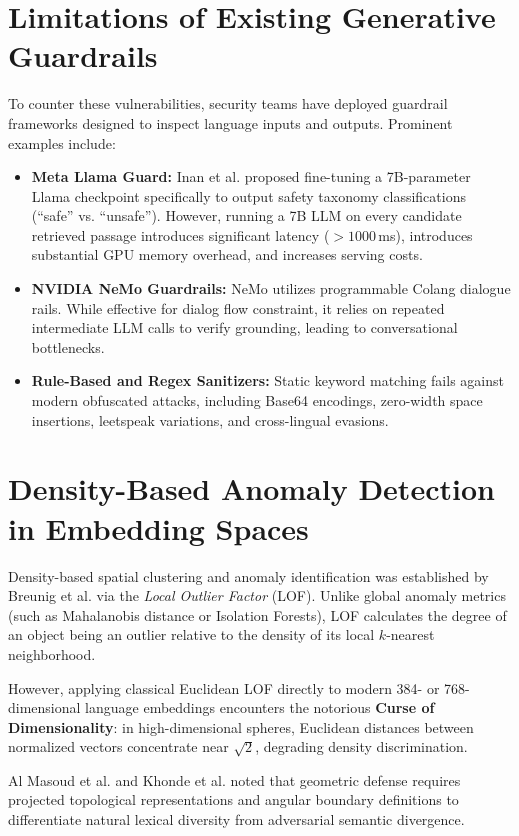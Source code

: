 \section{Limitations of Existing Generative Guardrails}
To counter these vulnerabilities, security teams have deployed guardrail frameworks designed to inspect language inputs and outputs. Prominent examples include:
\begin{itemize}
    \item \textbf{Meta Llama Guard:} Inan et al. \cite{inan2023llama} proposed fine-tuning a 7B-parameter Llama checkpoint specifically to output safety taxonomy classifications (\enquote{safe} vs. \enquote{unsafe}). However, running a 7B LLM on every candidate retrieved passage introduces significant latency ($> 1000$\,ms), introduces substantial GPU memory overhead, and increases serving costs.
    \item \textbf{NVIDIA NeMo Guardrails:} NeMo utilizes programmable Colang dialogue rails. While effective for dialog flow constraint, it relies on repeated intermediate LLM calls to verify grounding, leading to conversational bottlenecks.
    \item \textbf{Rule-Based and Regex Sanitizers:} Static keyword matching fails against modern obfuscated attacks, including Base64 encodings, zero-width space insertions, leetspeak variations, and cross-lingual evasions.
\end{itemize}

\section{Density-Based Anomaly Detection in Embedding Spaces}
Density-based spatial clustering and anomaly identification was established by Breunig et al. \cite{breunig2000lof} via the \textit{Local Outlier Factor} (LOF). Unlike global anomaly metrics (such as Mahalanobis distance or Isolation Forests), LOF calculates the degree of an object being an outlier relative to the density of its local $k$-nearest neighborhood. 

However, applying classical Euclidean LOF directly to modern 384- or 768-dimensional language embeddings encounters the notorious \textbf{Curse of Dimensionality}: in high-dimensional spheres, Euclidean distances between normalized vectors concentrate near $\sqrt{2}$, degrading density discrimination. 

Al Masoud et al. \cite{masoud2026sdrag} and Khonde et al. \cite{khonde2026end} noted that geometric defense requires projected topological representations and angular boundary definitions to differentiate natural lexical diversity from adversarial semantic divergence.

